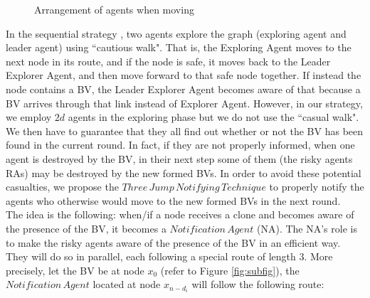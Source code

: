 \begin{figure} [H]
  \centering 
  \hspace{1in} 
  \caption{Arrangement of agents when moving} 
  \label{fig:subfig1} %
\end{figure}

In the sequential strategy \cite{alotaibi},  two agents explore the graph (exploring agent and leader agent)  using  ``cautious walk". That is, the Exploring Agent moves to the next node in its route, and if the node is safe, it moves back to the Leader Explorer Agent, and then move forward to that safe node together. If instead the node contains a BV, the Leader Explorer Agent becomes aware of that because a BV arrives through that link instead of Explorer Agent. 
However, in our strategy, we employ $2d$ agents in the exploring phase but we do not use the ``casual walk". We then have to guarantee that they all find out whether or not the BV has been found in the current round. In fact, if they are not properly informed, when one agent is destroyed by the BV, in their next step some of them (the risky agents RAs) may be destroyed by the new formed BVs. In order to avoid these potential casualties, we propose the $Three\,Jump\,Notifying\,Technique$ to properly notify the agents who otherwise would move to the new formed BVs in the next round.\\

The idea is the following: when/if a node receives a clone and becomes aware of the presence of the BV,  it becomes a  $Notification\,Agent$ (NA). The NA's role is to make the risky agents aware of the presence of the BV in an efficient way. They will do so in parallel, each following  a special  route of length 3.  More precisely, let the BV be at node $x_0$ (refer to Figure \ref{fig:subfig}), the $Notification\,Agent$ located at node $x_{n-d_i}$ will follow the following route:

